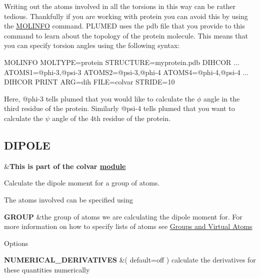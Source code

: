 Writing out the atoms involved in all the torsions in this way can be rather tedious. Thankfully if you are working with protein you can avoid this by using the \hyperlink{MOLINFO}{M\+O\+L\+I\+N\+F\+O} command. P\+L\+U\+M\+E\+D uses the pdb file that you provide to this command to learn about the topology of the protein molecule. This means that you can specify torsion angles using the following syntax\+:

\begin{DoxyVerb}MOLINFO MOLTYPE=protein STRUCTURE=myprotein.pdb
DIHCOR ...
ATOMS1=@phi-3,@psi-3
ATOMS2=@psi-3,@phi-4
ATOMS4=@phi-4,@psi-4
... DIHCOR
PRINT ARG=dih FILE=colvar STRIDE=10
\end{DoxyVerb}


Here, @phi-\/3 tells plumed that you would like to calculate the $\phi$ angle in the third residue of the protein. Similarly @psi-\/4 tells plumed that you want to calculate the $\psi$ angle of the 4th residue of the protein. \hypertarget{DIPOLE}{}\subsection{D\+I\+P\+O\+L\+E}\label{DIPOLE}
\begin{TabularC}{2}
\hline
&{\bfseries  This is part of the colvar \hyperlink{mymodules}{module }}   \\
\end{TabularC}
Calculate the dipole moment for a group of atoms.

\begin{DoxyParagraph}{The atoms involved can be specified using}

\end{DoxyParagraph}
\begin{TabularC}{2}
\hline
{\bfseries  G\+R\+O\+U\+P } &the group of atoms we are calculating the dipole moment for. For more information on how to specify lists of atoms see \hyperlink{Group}{Groups and Virtual Atoms}   \\
\end{TabularC}


\begin{DoxyParagraph}{Options}

\end{DoxyParagraph}
\begin{TabularC}{2}
\hline
{\bfseries  N\+U\+M\+E\+R\+I\+C\+A\+L\+\_\+\+D\+E\+R\+I\+V\+A\+T\+I\+V\+E\+S } &( default=off ) calculate the derivatives for these quantities numerically  

\\
\end{TabularC}


